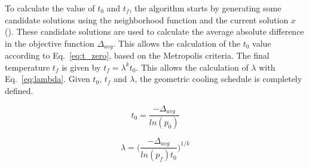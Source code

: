To calculate the value of $t_0$ and $t_f$, the algorithm starts by generating some candidate solutions using the neighborhood function and the current solution $x$ (\cite{SA_methods}). These candidate solutions are used to calculate the average absolute difference in the objective function $\Delta_{avg}$. This allows the calculation of the  $t_0$ value according to Eq.~\ref{eq:t_zero}, based on the Metropolis criteria. The final temperature $t_f$ is given by $t_f = \lambda^{k}t_0$. This allows the calculation of $\lambda$ with Eq.~\ref{eq:lambda}. Given $t_0$, $t_f$ and $\lambda$, the geometric cooling schedule is completely defined.

\begin{equation}
\label{eq:t_zero}
    t_0 = \frac{-\Delta_{avg}}{ln(p_0)}
\end{equation}

\begin{equation}
\label{eq:lambda}
    \lambda = \bigg( \frac{-\Delta_{avg}}{ln(p_f)t_0} \bigg)^{1/k}
\end{equation}















